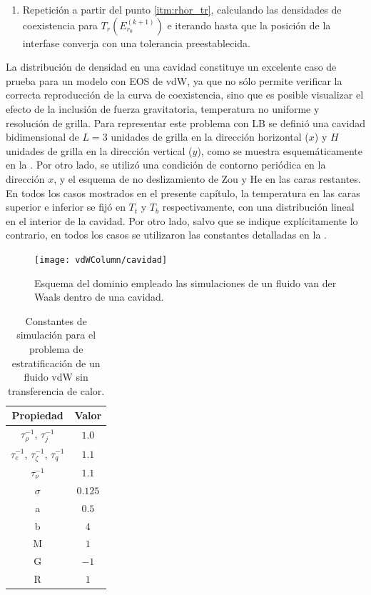 \begin{enumerate}
\item Repetici\'on a partir del punto \ref{itm:rhor_tr}, calculando las densidades de coexistencia para $T_r(E_{r_0}^{(k+1)})$ e iterando hasta que la posici\'on de la interfase converja con una tolerancia preestablecida.

\end{enumerate}


La distribuci\'on de densidad en una cavidad constituye un excelente caso de prueba para un modelo \pp{} con EOS de vdW, ya que no s\'olo permite verificar la correcta reproducci\'on de la curva de coexistencia, sino que es posible visualizar el efecto de la inclusi\'on de fuerza gravitatoria, temperatura no uniforme y resoluci\'on de grilla. Para representar este problema con LB se defini\'o una cavidad bidimensional de $L=3$ unidades de grilla en la direcci\'on horizontal ($x$) y $H$ unidades de grilla en la direcci\'on vertical ($y$), como se muestra esquem\'aticamente en la . Por otro lado, se utiliz\'o una condici\'on de contorno peri\'odica en la direcci\'on $x$, y el esquema de no deslizamiento de Zou y He en las caras restantes. En todos los casos mostrados en el presente cap\'itulo, la temperatura en las caras superior e inferior se fij\'o en $T_t$ y $T_b$ respectivamente, con una distribuci\'on lineal en el interior de la cavidad. Por otro lado, salvo que se indique expl\'icitamente lo contrario, en todos los casos se utilizaron las constantes detalladas en la .


\begin{figure}[ht]
	\centering
	\texttt{[image: vdWColumn/cavidad]}
	\caption{Esquema del dominio empleado las simulaciones de un fluido van der Waals dentro de una cavidad.}
	\label{fig:vdWColumn_cavidad}
\end{figure}

\begin{table}[ht]
	\centering
    \begin{tabular}{c c}
	    \toprule
        \bf Propiedad & \bf Valor \\
        \midrule
        $\tau_{\rho}^{-1}$, $\tau_{j}^{-1}$ & $1.0$\\
        $\tau_{e}^{-1}$, $\tau_{\zeta}^{-1}$, $\tau_{q}^{-1}$ & $1.1$ \\
        $\tau_{\nu}^{-1}$ & $1.1$ \\
        $\sigma$ & $0.125$ \\
		a & $0.5$ \\
		b & $4$ \\
		M & $1$ \\
		G & $-1$ \\
		R & $1$ \\
        \bottomrule
	\end{tabular}
	\caption{Constantes de simulaci\'on para el problema de estratificaci\'on de un fluido vdW sin transferencia de calor.}
	\label{tab:vdW_isot}
\end{table}  
\FloatBarrier

